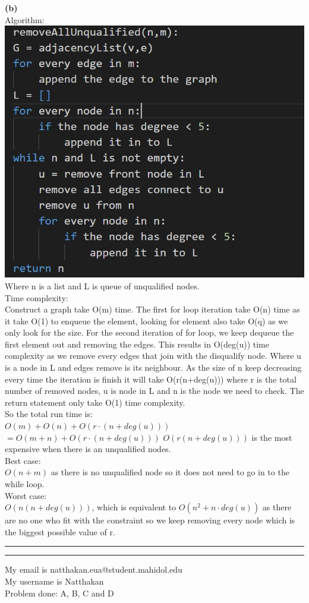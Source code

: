 \documentclass[a4paper, 11pt]{article}
\newcommand{\question}[2] {\vspace{.25in} \hrule\vspace{0.5em}
\noindent{\bf #1: #2} \vspace{0.5em}
\hrule \vspace{.10in}}
\renewcommand{\part}[1] {\vspace{.10in} {\bf (#1)}}
\begin{document}
\part{b}\\
Algorithm:\\
\includegraphics[width=\textwidth]{P5.jpg}\\
Where n is a list and L is queue of unqualified nodes.\\
Time complexity:\\
Construct a graph take O(m) time. The first for loop iteration take O(n) time as it take O(1) to enqueue the element, looking for element also take O(q) as we only look for the size. For the second iteration of for loop, we keep dequeue the first element out and removing the edges. This results in O(deg(u)) time complexity as we remove every edges that join with the disqualify node. Where u is a node in L and edges remove is its neighbour. As the size of n keep decreasing every time the iteration is finish it will take O(r(n+deg(u))) where r is the total number of removed nodes, u is node in L and n is the node we need to check. The return statement only take O(1) time complexity.\\
So the total run time is:\\
$O(m) + O(n) + O(r\cdot(n+deg(u)))$\\
$= O(m+n) + O(r\cdot(n+deg(u)))$
$O(r(n+deg(u)))$ is the most expensive when there is an unqualified nodes.\\
Best case:\\
$O(n+m)$ as there is no unqualified node so it does not need to go in to the while loop.\\
Worst case:\\
$O(n(n+deg(u)))$, which is equivalent to $O(n^{2} + n\cdot deg(u))$ as there are no one who fit with the constraint so we keep removing every node which is the biggest possible value of r.
\question{6}{Problem6}
My email is natthakan.eua@student.mahidol.edu\\
My username is Natthakan\\
Problem done: A, B, C and D
\end{document}
